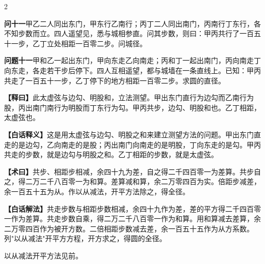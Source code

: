 \documentclass[11pt,a4paper]{article}
\newcommand{\WenQuestion}[1]{\textbf{\textcolor{classicalcolor}{#1}}}
\newcommand{\BaiQuestion}[1]{\textbf{\textcolor{moderncolor}{#1}}}
\newcommand{\WenExplain}{\textcolor{classicalcolor}{\textbf{【释曰】}}}
\newcommand{\BaiExplain}{\textcolor{moderncolor}{\textbf{【白话释义】}}}
\newcommand{\WenMethod}{\textcolor{classicalcolor}{\textbf{【术曰】}}}
\newcommand{\BaiMethod}{\textcolor{moderncolor}{\textbf{【白话解法】}}}
\begin{document}
\begin{paracol}{2}

\switchcolumn*
\begin{tcolorbox}[colback=red!3,colframe=red!30!black,boxrule=0.3pt]
\WenQuestion{问十一}\quad 甲乙二人同出东门，甲东行乙南行；丙丁二人同出南门，丙南行丁东行，各不知步数而立。四人遥望见，悉与城相参直。问其步数，则曰：甲丙共行了一百五十一步，乙丁立处相距一百零二步。问城径。
\end{tcolorbox}
\switchcolumn
\begin{tcolorbox}[colback=blue!3,colframe=blue!30!black,boxrule=0.3pt]
\BaiQuestion{问题十一}\quad 甲和乙一起出东门，甲向东走乙向南走；丙和丁一起出南门，丙向南走丁向东走，各走若干步后停下。四人互相遥望，都与城墙在一条直线上。已知：甲丙共走了一百五十一步，乙丁停下的地方相距一百零二步。求圆的直径。
\end{tcolorbox}

\switchcolumn*
\begin{tcolorbox}[colback=red!5,colframe=red!30!black,boxrule=0.3pt]
\WenExplain\quad 此太虚弦与边勾、明股和，立法测望。甲出东门直行为边勾而乙南行为股，丙出南门南行为明股而丁东行为勾。甲丙共步，边勾、明股和也。乙丁相距，太虚弦也。
\end{tcolorbox}
\switchcolumn
\begin{tcolorbox}[colback=blue!5,colframe=blue!30!black,boxrule=0.3pt]
\BaiExplain\quad 这是用太虚弦与边勾、明股之和来建立测望方法的问题。甲出东门直走的是边勾，乙向南走的是股；丙出南门向南走的是明股，丁向东走的是勾。甲丙共走的步数，就是边勾与明股之和。乙丁相距的步数，就是太虚弦。
\end{tcolorbox}

\switchcolumn*
\begin{tcolorbox}[colback=red!5,colframe=red!40!black,boxrule=0.3pt]
\WenMethod\quad 共步、相距步相减，余四十九为差，自之得二千四百零一为差算。共步自之，得二万二千八百零一为和算。差算减和算，余二万零四百为实。倍距步减差，余一百五十五为从。作以从减法，开平方法除之，得全径。
\end{tcolorbox}
\switchcolumn
\begin{tcolorbox}[colback=blue!5,colframe=blue!40!black,boxrule=0.3pt]
\BaiMethod\quad 共走步数与相距步数相减，余四十九作为差，差的平方得二千四百零一作为差算。共走步数自乘，得二万二千八百零一作为和算。用和算减去差算，余二万零四百作为被开方数。二倍相距步数减去差，余一百五十五作为从方系数。列"以从减法"开平方方程，开方求之，得圆的全径。
\end{tcolorbox}

\switchcolumn*
\small 以从减法开平方法见前。


\end{paracol}
\end{document}
